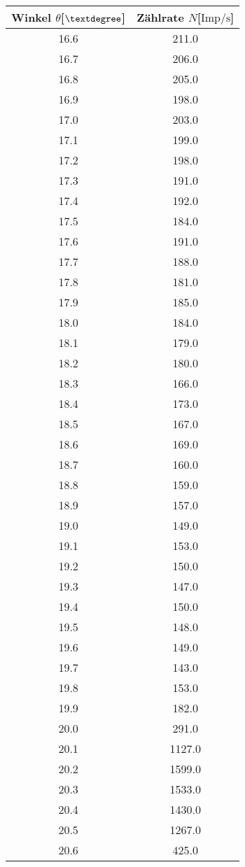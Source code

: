 \begin{table}
\begin{minipage}{0.5\textwidth}
\end{minipage}
\begin{minipage}{0.5\textwidth}
\centering
\label{tab:cuwerte2}
\begin{tabular}{c c}
    \toprule
    Winkel $\theta$[$\textdegree$] & Zählrate $N$[$\si{{\text{Imp}}\per\second}$]\\
    \midrule
16.6	&	211.0\\
16.7	&	206.0\\
16.8	&	205.0\\
16.9	&	198.0\\
17.0	&	203.0\\
17.1	&	199.0\\
17.2	&	198.0\\
17.3	&	191.0\\
17.4	&	192.0\\
17.5	&	184.0\\
17.6	&	191.0\\
17.7	&	188.0\\
17.8	&	181.0\\
17.9	&	185.0\\
18.0	&	184.0\\
18.1	&	179.0\\
18.2	&	180.0\\
18.3	&	166.0\\
18.4	&	173.0\\
18.5	&	167.0\\
18.6	&	169.0\\
18.7	&	160.0\\
18.8	&	159.0\\
18.9	&	157.0\\
19.0	&	149.0\\
19.1	&	153.0\\
19.2	&	150.0\\
19.3	&	147.0\\
19.4	&	150.0\\
19.5	&	148.0\\
19.6	&	149.0\\
19.7	&	143.0\\
19.8	&	153.0\\
19.9	&	182.0\\
20.0	&	291.0\\
20.1	&	1127.0\\
20.2	&	1599.0\\
20.3	&	1533.0\\
20.4	&	1430.0\\
20.5	&	1267.0\\
20.6	&	425.0\\

\end{tabular}
\end{minipage}
\end{table}
